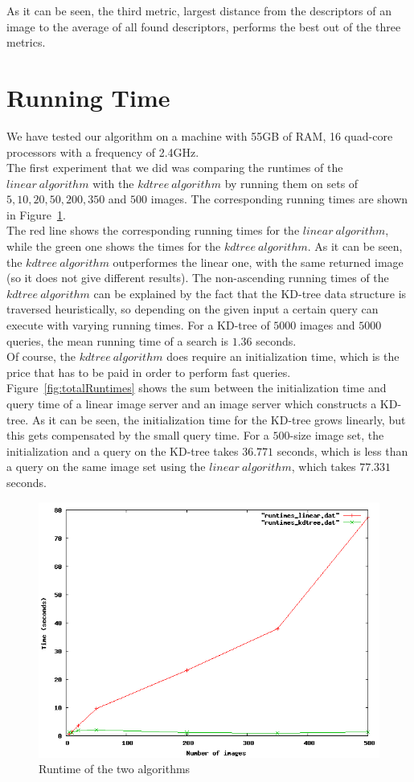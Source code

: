 As it can be seen, the third metric, largest distance from the descriptors of an image to the average of all found descriptors, performs the best out of the three metrics.

\section{Running Time}
We have tested our algorithm on a machine with 55GB of RAM, 16 quad-core processors with a frequency of 2.4GHz.\\

The first experiment that we did was comparing the runtimes of the $linear\ algorithm$ with the $kdtree\ algorithm$ by running them on sets of $5, 10, 20, 50, 200, 350$ and $500$ images. The corresponding running times are shown in Figure~\ref{fig:runtimesBasic}.\\
The red line shows the corresponding running times for the $linear\ algorithm$, while the green one shows the times for the $kdtree\ algorithm$. As it can be seen, the $kdtree\ algorithm$ outperformes the linear one, with the same returned image (so it does not give different results). The non-ascending running times of the $kdtree\ algorithm$ can be explained by the fact that the KD-tree data structure is traversed heuristically, so depending on the given input a certain query can execute with varying running times. For a KD-tree of $5000$ images and $5000$ queries, the mean running time of a search is $1.36$ seconds.\\
Of course, the $kdtree\ algorithm$ does require an initialization time, which is the price that has to be paid in order to perform fast queries. Figure~\ref{fig:totalRuntimes} shows the sum between the initialization time and query time of a linear image server and an image server which constructs a KD-tree. As it can be seen, the initialization time for the KD-tree grows linearly, but this gets compensated by the small query time. For a $500$-size image set, the initialization and a query on the KD-tree takes $36.771$ seconds, which is less than a query on the same image set using the $linear\ algorithm$, which takes $77.331$ seconds.

\begin{figure}[ht!]
\centering
\includegraphics[width=.7\linewidth]{images/runtimesBasic.png}
\caption{Runtime of the two algorithms}
\label{fig:runtimesBasic}
\end{figure}

